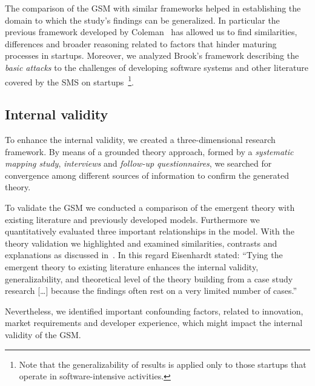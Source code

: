 \documentclass[10pt,journal,letterpaper,compsoc]{IEEEtran}
\begin{document}
The comparison of the GSM with similar frameworks helped in establishing the
domain to which the study's findings can be generalized. In particular the
previous framework developed by Coleman~\cite{Coleman2008} has allowed us to
find similarities, differences and broader reasoning related to factors that
hinder maturing processes in startups. Moreover, we analyzed Brook's framework
describing the \textit{basic attacks} to the challenges of developing software
systems and other literature covered by the SMS on 
startups~\cite{SMS}\footnote{Note that the generalizability of results is 
applied only to those startups that operate in software-intensive activities.}.

\subsection{Internal validity} %
To enhance the internal validity, we created a three-dimensional research 
framework. By means of a grounded theory approach, formed by a 
\textit{systematic mapping study}, \textit{interviews}
and \textit{follow-up questionnaires}, we searched for convergence among
different sources of information to confirm the generated theory.

To validate the GSM we conducted a comparison of the emergent theory with
existing literature and previously developed models. Furthermore we
quantitatively evaluated three important relationships in the model. With the
theory validation we highlighted and examined similarities, contrasts and
explanations as discussed in~\cite{Eisenhardt2007}. In this regard Eisenhardt
stated: ``Tying the emergent theory to existing literature enhances the internal
validity, generalizability, and theoretical level of the theory building from a
case study research [\ldots] because the findings often rest on a very limited
number of cases.''

Nevertheless, we identified important confounding factors, related to
innovation, market requirements and developer experience, which might impact
the internal validity of the GSM.
\end{document}
